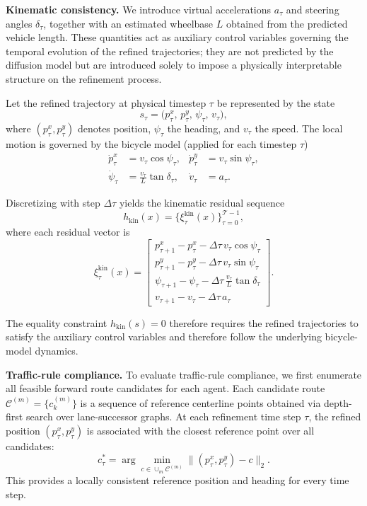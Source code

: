 \documentclass[10pt,twocolumn,letterpaper]{article}
\theoremstyle{plain}
\theoremstyle{remark}
\renewcommand{\paragraph}[1]{\vspace{.5em}\noindent\textbf{#1.}}
\begin{document}
\paragraph{Kinematic consistency}
We introduce virtual accelerations \(a_\tau\) and steering angles
\(\delta_\tau\), together with an estimated wheelbase \(L\) obtained
from the predicted vehicle length.  
These quantities act as auxiliary control variables governing the temporal evolution of the refined trajectories; they are not predicted by the diffusion model but are introduced solely to impose a physically interpretable structure on the refinement process.

Let the refined trajectory at physical timestep \(\tau\) be represented by the
state
\[
s_\tau = \bigl(p^x_\tau,\, p^y_\tau,\, \psi_\tau,\, v_\tau\bigr),
\]
where \((p^x_\tau,p^y_\tau)\) denotes position, \(\psi_\tau\) the heading,
and \(v_\tau\) the speed.  
The local motion is governed by the bicycle model (applied for each timestep \(\tau\))
\[
\begin{aligned}
\dot{p}^x_\tau &= v_\tau\cos\psi_\tau, &
\dot{p}^y_\tau &= v_\tau\sin\psi_\tau, \\
\dot{\psi}_\tau &= \tfrac{v_\tau}{L}\tan\delta_\tau, &
\dot{v}_\tau &= a_\tau.
\end{aligned}
\]

Discretizing with step \(\Delta \tau\) yields the kinematic residual sequence  
\[
h_{\mathrm{kin}}(x)
=
\bigl\{
\xi^{\mathrm{kin}}_\tau(x)
\bigr\}_{\tau=0}^{\mathcal{T}-1},
\]
where each residual vector is
\[
\xi^{\mathrm{kin}}_\tau(x)
=
\begin{bmatrix}
p^x_{\tau+1}-p^x_\tau-\Delta \tau\, v_\tau\cos\psi_\tau \\
p^y_{\tau+1}-p^y_\tau-\Delta \tau\, v_\tau\sin\psi_\tau \\
\psi_{\tau+1}-\psi_\tau-\Delta \tau\, \tfrac{v_\tau}{L}\tan\delta_\tau \\
v_{\tau+1}-v_\tau-\Delta \tau\, a_\tau
\end{bmatrix}.
\]

The equality constraint \(h_{\mathrm{kin}}(s)=0\) therefore
requires the refined trajectories to satisfy the auxiliary control variables and therefore follow the
underlying bicycle-model dynamics.

\paragraph{Traffic-rule compliance}
To evaluate traffic-rule compliance, we first enumerate all
feasible forward route candidates for each agent.  
Each candidate route \(\mathcal{C}^{(m)}=\{c^{(m)}_k\}\) is a
sequence of reference centerline points obtained via depth-first search over lane-successor graphs.  
At each refinement time step \(\tau\), the refined position
\((p^x_\tau,p^y_\tau)\) is associated with the closest reference point
over all candidates:
\[
c_\tau^\ast
=
\arg\min_{c \in \cup_m \mathcal{C}^{(m)}}
\bigl\|(p^x_\tau,p^y_\tau)-c\bigr\|_2.
\]
This provides a locally consistent reference position and heading
for every time step.
\end{document}
